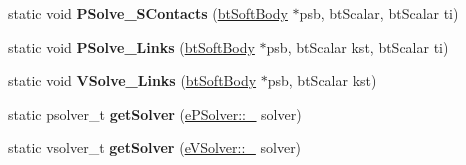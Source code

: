 \begin{DoxyCompactItemize}
static void {\bfseries P\+Solve\+\_\+\+S\+Contacts} (\hyperlink{classbtSoftBody}{bt\+Soft\+Body} $\ast$psb, bt\+Scalar, bt\+Scalar ti)
\item 
\mbox{\label{classbtSoftBody_a0097a8dcdbf3edf51c896348e7f6d075}} 
static void {\bfseries P\+Solve\+\_\+\+Links} (\hyperlink{classbtSoftBody}{bt\+Soft\+Body} $\ast$psb, bt\+Scalar kst, bt\+Scalar ti)
\item 
\mbox{\label{classbtSoftBody_a5d1bc8003163e9f8a79e94fc2def5d70}} 
static void {\bfseries V\+Solve\+\_\+\+Links} (\hyperlink{classbtSoftBody}{bt\+Soft\+Body} $\ast$psb, bt\+Scalar kst)
\item 
\mbox{\label{classbtSoftBody_ae2ab143e48d092e818a3b4180016f469}} 
static psolver\+\_\+t {\bfseries get\+Solver} (\hyperlink{structbtSoftBody_1_1ePSolver_a5d6ab41a09da7333bc2047b4ea14bf86}{e\+P\+Solver\+::\+\_\+} solver)
\item 
\mbox{\label{classbtSoftBody_ad6063e28f3c00c308baf4f1ea8b161d3}} 
static vsolver\+\_\+t {\bfseries get\+Solver} (\hyperlink{structbtSoftBody_1_1eVSolver_ad6a7083f91529d75cab91506cd63e088}{e\+V\+Solver\+::\+\_\+} solver)
\end{DoxyCompactItemize}
